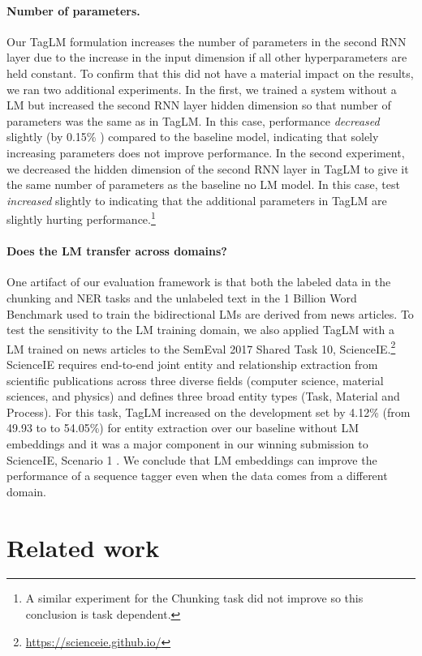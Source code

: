 \documentclass[11pt,a4paper]{article}
\begin{document}
\paragraph{Number of parameters.}  Our TagLM formulation increases the
number of parameters in the second  RNN layer  due to the increase
in the input dimension  if all other hyperparameters are held constant.
To confirm that this did not have a material impact on the results, we ran two additional experiments.
In the first, we trained a system without a LM but increased the second  RNN layer
hidden dimension so that number of parameters was the same as in TagLM.
In this case, performance \textit{decreased} slightly (by 0.15\% ) compared to the baseline model, indicating
that solely increasing parameters does not improve performance.  In the second experiment, we decreased
the hidden dimension of the second RNN layer in TagLM to give it the same number
of parameters as the baseline no LM model.  In this case, test  \textit{increased} slightly
to  indicating that the additional parameters in TagLM are slightly hurting performance.\footnote{A similar experiment
for the Chunking task did not improve  so this conclusion is task dependent.} 

\paragraph{Does the LM transfer across domains?}
One artifact of our evaluation framework is that both the labeled data in the chunking and NER tasks
and the unlabeled text in the 1 Billion Word Benchmark used to train the bidirectional LMs are derived from news articles.
To test the sensitivity to the LM training domain, we also applied TagLM with a LM trained on news articles
to the SemEval 2017 Shared Task 10, ScienceIE.\footnote{\url{https://scienceie.github.io/}}
ScienceIE requires end-to-end
joint entity and relationship extraction from scientific publications across three diverse fields (computer science, material sciences, and physics) and defines three broad entity types (Task, Material and Process).
For this task, TagLM increased  on the development set by 4.12\% (from 49.93 to
to 54.05\%) for entity extraction over our baseline without LM embeddings and it was a major component
in our winning submission to ScienceIE, Scenario 1 \citep{scienceie}.
We conclude that LM embeddings can improve the performance of a sequence tagger even when the data comes from a different domain.

\section{Related work}
\end{document}
